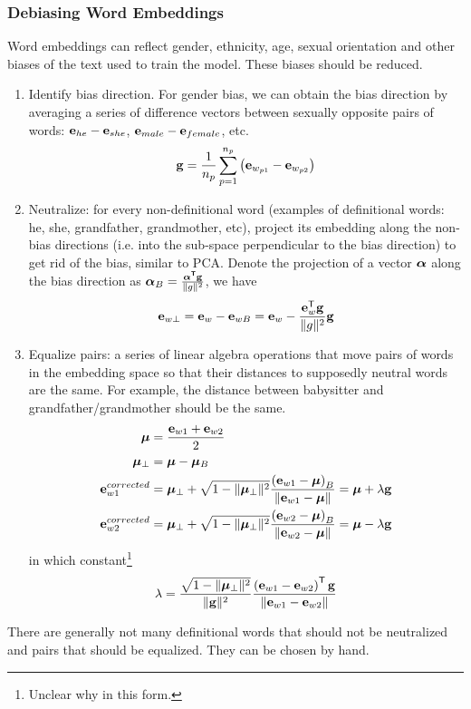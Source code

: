 \subsubsection{Debiasing Word Embeddings}
Word embeddings can reflect gender, ethnicity, age, sexual orientation and other biases of the text used to train the model. These biases should be reduced.
\begin{enumerate}
  \item Identify bias direction. For gender bias, we can obtain the bias direction by averaging a series of difference vectors between sexually opposite pairs of words: $\mathbf{e}_{he}-\mathbf{e}_{she}$, $\mathbf{e}_{male}-\mathbf{e}_{female}$, etc.  
  \[\mathbf{\boldsymbol{g}}=\frac{1}{n_p}\displaystyle\sum_{p=1}^{n_p}\left(\mathbf{e}_{w_{p1}}-\mathbf{e}_{w_{p2}}\right)\]
  \item Neutralize: for every non-definitional word (examples of definitional words: he, she, grandfather, grandmother, etc), project its embedding along the non-bias directions (i.e. into the sub-space perpendicular to the bias direction) to get rid of the bias, similar to PCA. Denote the projection of a vector $\mathbf{\boldsymbol{\alpha}}$ along the bias direction as $\mathbf{\boldsymbol{\alpha}}_B=\frac{\mathbf{\boldsymbol{\alpha^{\mathsf{T}}g}}}{\Vert g\Vert^2}$, we have  
  \[\mathbf{\boldsymbol{e}}_{w\perp}=\mathbf{e}_{w}-\mathbf{\boldsymbol{e}}_{wB}=\mathbf{e}_{w}-\frac{\mathbf{e}_{w}^{\mathsf{T}}\mathbf{\boldsymbol{g}}}{\Vert g\Vert^2}\mathbf{\boldsymbol{g}}\]
  \item Equalize pairs: a series of linear algebra operations that move pairs of words in the embedding space so that their distances to supposedly neutral words are the same. For example, the distance between babysitter and grandfather/grandmother should be the same. 
  \begin{align*}
    \mathbf{\boldsymbol{\mu}}&=\frac{\mathbf{e}_{w1}+\mathbf{e}_{w2}}{2}\\
    \mathbf{\boldsymbol{\mu}}_{\perp}&=\mathbf{\boldsymbol{\mu}}-\mathbf{\boldsymbol{\mu}}_B\\
    \mathbf{e}_{w1}^{corrected}&=\mathbf{\boldsymbol{\mu}}_{\perp}+\sqrt{1-\Vert\mathbf{\boldsymbol{\mu}}_{\perp}\Vert^2}\frac{\left(\mathbf{e}_{w1}-\mathbf{\boldsymbol{\mu}}\right)_B}{\Vert\mathbf{e}_{w1}-\mathbf{\boldsymbol{\mu}}\Vert}=\mathbf{\boldsymbol{\mu}}+\lambda\mathbf{\boldsymbol{g}}\\
    \mathbf{e}_{w2}^{corrected}&=\mathbf{\boldsymbol{\mu}}_{\perp}+\sqrt{1-\Vert\mathbf{\boldsymbol{\mu}}_{\perp}\Vert^2}\frac{\left(\mathbf{e}_{w2}-\mathbf{\boldsymbol{\mu}}\right)_B}{\Vert\mathbf{e}_{w2}-\mathbf{\boldsymbol{\mu}}\Vert}=\mathbf{\boldsymbol{\mu}}-\lambda\mathbf{\boldsymbol{g}}\\
  \end{align*}
  in which constant\footnote{Unclear why in this form.}
  \[\lambda=\frac{\sqrt{1-\Vert\mathbf{\boldsymbol{\mu}}_{\perp}\Vert^2}}{\Vert\mathbf{\boldsymbol{g}}\Vert^2}\frac{\left(\mathbf{e}_{w1}-\mathbf{e}_{w2}\right)^{\mathsf{T}}\mathbf{\boldsymbol{g}}}{\Vert\mathbf{e}_{w1}-\mathbf{e}_{w2}\Vert}\]
\end{enumerate}
There are generally not many definitional words that should not be neutralized and pairs that should be equalized. They can be chosen by hand.
\ifx\PREAMBLE\undefined

\fi
